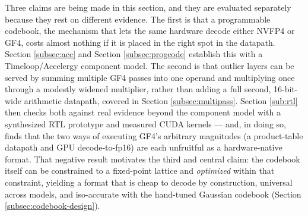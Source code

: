 Three claims are being made in this section, and they are evaluated separately
because they rest on different evidence. The first is that a programmable
codebook, the mechanism that lets the same hardware decode either NVFP4 or GF4,
costs almost nothing if it is placed in the right spot in the datapath.
Section \ref{subsec:acc} and Section \ref{subsec:progcode} establish this with a
Timeloop/Accelergy component model. The second is that outlier layers can be
served by summing multiple GF4 passes into one operand and multiplying once
through a modestly widened multiplier, rather than adding a full second,
16-bit-wide arithmetic datapath, covered in Section \ref{subsec:multipass}.
Section \ref{sub:rtl} then checks both against real evidence beyond the component
model with a synthesized RTL prototype and measured CUDA kernels --- and, in
doing so, finds that the two ways of executing GF4's arbitrary magnitudes (a
product-table datapath and GPU decode-to-fp16) are each unfruitful as a
hardware-native format. That negative result motivates the third and central
claim: the codebook itself can be constrained to a fixed-point lattice and
\emph{optimized} within that constraint, yielding a format that is cheap to
decode by construction, universal across models, and iso-accurate with the
hand-tuned Gaussian codebook (Section \ref{subsec:codebook-design}).

